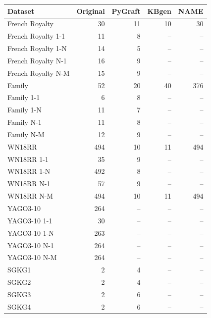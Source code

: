 \begin{tabular}{lrrrr}
\toprule
Dataset & Original & PyGraft & KBgen & NAME \\
\midrule
French Royalty & 30 & 11 & 10 & 30 \\
French Royalty 1-1 & 11 & 8 & – & – \\
French Royalty 1-N & 14 & 5 & – & – \\
French Royalty N-1 & 16 & 9 & – & – \\
French Royalty N-M & 15 & 9 & – & – \\
\midrule
Family & 52 & 20 & 40 & 376 \\
Family 1-1 & 6 & 8 & – & – \\
Family 1-N & 11 & 7 & – & – \\
Family N-1 & 11 & 8 & – & – \\
Family N-M & 12 & 9 & – & – \\
\midrule
WN18RR & 494 & 10 & 11 & 494 \\
WN18RR 1-1 & 35 & 9 & – & – \\
WN18RR 1-N & 492 & 8 & – & – \\
WN18RR N-1 & 57 & 9 & – & – \\
WN18RR N-M & 494 & 10 & 11 & 494 \\
\midrule
YAGO3-10 & 264 & – & – & – \\
YAGO3-10 1-1 & 30 & – & – & – \\
YAGO3-10 1-N & 263 & – & – & – \\
YAGO3-10 N-1 & 264 & – & – & – \\
YAGO3-10 N-M & 264 & – & – & – \\
\midrule
SGKG1 & 2 & 4 & – & – \\
SGKG2 & 2 & 4 & – & – \\
SGKG3 & 2 & 6 & – & – \\
SGKG4 & 2 & 6 & – & – \\
\bottomrule
\end{tabular}
